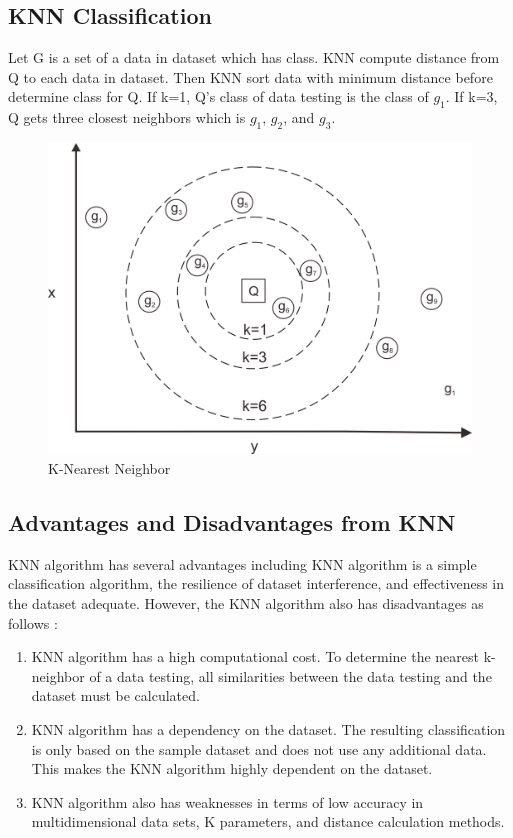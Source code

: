 \subsection{KNN Classification}
Let G is a set of a data in dataset which has class. KNN compute distance from Q to each data in dataset. Then KNN sort data with minimum distance before determine class for Q. If k=1, Q's class of data testing is the class of $g_{1}$. If k=3, Q gets three closest neighbors which is $g_{1}$, $g_{2}$, and $g_{3}$.

\begin{figure}[H]
    \centering
    \includegraphics[scale=0.4]{knn.png}
    \caption{K-Nearest Neighbor}
    \label{fig:KNN}
\end{figure}



\subsection{Advantages and Disadvantages from KNN}
KNN algorithm has several advantages including KNN algorithm is a simple classification algorithm, the resilience of dataset interference, and effectiveness in the dataset adequate. However, the KNN algorithm also has disadvantages as follows \cite{zhang2013} :

\begin{enumerate}[label=- , leftmargin=*, topsep=5pt, itemsep=-1ex, partopsep=1ex, parsep=2ex]
\item KNN algorithm has a high computational cost. To determine the nearest k-neighbor of a data testing, all similarities between the data testing and the dataset must be calculated.
\item KNN algorithm has a dependency on the dataset. The resulting classification is only based on the sample dataset and does not use any additional data. This makes the KNN algorithm highly dependent on the dataset.
\item KNN algorithm also has weaknesses in terms of low accuracy in multidimensional data sets, K parameters, and distance calculation methods.
\end{enumerate}


